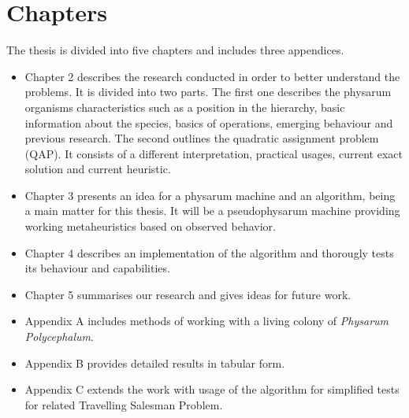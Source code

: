 \section{Chapters}
\label{section:introduction_chapters}

The thesis is divided into five chapters and includes three appendices.

\begin{itemize}
  \item Chapter 2 describes the research conducted in order to better understand the problems. It is divided into two parts. The first one describes the physarum organisms characteristics such as a position in the hierarchy, basic information about the species, basics of operations, emerging behaviour and previous research. The second outlines the quadratic assignment problem (QAP). It consists of a different interpretation, practical usages, current exact solution and current heuristic.
  \item Chapter 3 presents an idea for a physarum machine and an algorithm, being a main matter for this thesis. It will be a pseudophysarum machine providing working metaheuristics based on observed behavior.
  \item Chapter 4 describes an implementation of the algorithm and thorougly tests its behaviour and capabilities.
  \item Chapter 5 summarises our research and gives ideas for future work.
  \item Appendix A includes methods of working with a living colony of \textit{Physarum Polycephalum}.
  \item Appendix B provides detailed results in tabular form.
  \item Appendix C extends the work with usage of the algorithm for simplified tests for related Travelling Salesman Problem.
\end{itemize}
